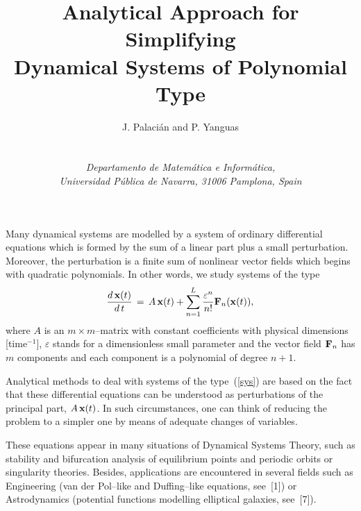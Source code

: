 \oddsidemargin 0.1in
\evensidemargin -0.8in
\topmargin -0.75in
\textheight 24cm
\textwidth 16cm


\def\Vec#1{\mbox{$\bf#1$}}
\newcommand{\Sum}{\displaystyle\sum}
\newcommand{\Eqref}[1]{(\ref{#1})}
\newcommand{\Frac}[2]{\mbox{$\displaystyle\frac{#1}{#2}$}}


\title{\bf Analytical Approach for Simplifying\\
           Dynamical Systems of Polynomial Type}

 \author{
{\small
 \begin{tabular}{c}
    J. Palaci\'an and P. Yanguas
 \end{tabular}} \\[2ex]
{\footnotesize
 \begin{tabular}{c}
               {\it Departamento de Matem\'atica e Inform\'atica,}\\
               {\it Universidad P\'ublica de Navarra, 31006 Pamplona, Spain}
   \end{tabular}}}
\date{}




\maketitle

Many dynamical systems are modelled by a system of ordinary differential
equations which is formed by the sum of a linear part plus a small
perturbation.
Moreover, the perturbation is a finite sum of nonlinear vector fields which
begins
with quadratic polynomials. In other words, we study systems of the type
\begin{equation}
\Frac{d\,\Vec{x}(t)}{d\,t}\,=\,A\,\Vec{x}(t)+
   \Sum_{n=1}^L\Frac{\varepsilon^n}{n!}\Vec{F}_n(\Vec{x}(t)),\label{sys}
\end{equation}
where $A$ is an $m\times m$--matrix with constant coefficients with physical
dimensions [time$^{-1}$], $\varepsilon$ stands for a dimensionless small
parameter
and the vector field $\Vec{F}_n$ has $m$ components and each component
is a polynomial of degree $n+1$.

Analytical methods to deal with systems of the type~\Eqref{sys} are based
on the
fact  that these differential equations can be understood as perturbations
of the principal part, $A\,\Vec{x}(t)$. In such circumstances, one can think of
reducing the problem to a simpler one by means of adequate changes of
variables.

These equations appear in many situations of Dynamical Systems Theory, such as
stability and bifurcation analysis of equilibrium points and periodic orbits or
singularity theories. Besides, applications are encountered in several
fields such
as Engineering (van der Pol--like and Duffing--like equations, see~[1]) or
Astrodynamics
(potential functions modelling elliptical galaxies, see~[7]).

